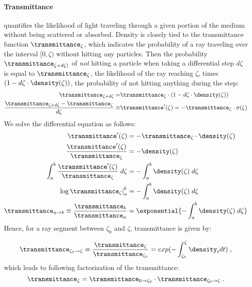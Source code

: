 \paragraph{Transmittance} 
quantifies the likelihood of light traveling through a given portion of the medium without being scattered or absorbed. Density is closely tied to the transmittance function $\transmittance_{\zeta}$, which indicates the probability of a ray traveling over the interval $[0, \zeta)$ without hitting any particles. Then the probability $\transmittance_{\zeta {+} d\zeta)}$ of \emph{not} hitting a particle when taking a differential step $d\zeta$ is equal to $\transmittance_{\zeta}$, the likelihood of the ray reaching $\zeta$, times $(1 - d\zeta \cdot \density(\zeta))$, the probability of not hitting anything during the step:
% 
\begin{align}
\transmittance_{\zeta+d\zeta} =& \transmittance_{\zeta} \cdot (1 - d\zeta \cdot \density(\zeta))
\\
\frac{\transmittance_{\zeta+d\zeta} - \transmittance_{\zeta}}{d\zeta} \equiv& \transmittance'(\zeta) = -\transmittance_{\zeta} \cdot \sigma(\zeta) 
\label{eq:derivative}
\end{align}
% 
We solve the differential equation as follows:
%
\begin{align}
\transmittance'(\zeta) &= -\transmittance_{\zeta} \cdot \density(\zeta) \\
\frac{\transmittance'(\zeta)}{\transmittance_{\zeta}} &= -\density(\zeta) \\
\int_a^b \frac{\transmittance'(\zeta)}{\transmittance_{\zeta}} \; d\zeta &= -\int_a^b \density(\zeta) \; d\zeta \\
\left. \log \transmittance_{\zeta} \right|_a^b &= -\int_a^b \density(\zeta) \; d\zeta \\
\transmittance_{a \rightarrow b} \equiv \frac{\transmittance_{b}}{\transmittance_{a}} &= \exponential{-\int_a^b \density(\zeta) \; d\zeta}   
\end{align}
% 
Hence, for a ray segment between $\zeta_0$ and $\zeta$, transmittance is given by:

\begin{equation}
\transmittance_{\zeta_0 \rightarrow \zeta} \equiv \frac{\transmittance_{\zeta}}{\transmittance_{\zeta_0}} = exp({-\int_{\zeta_0}^\zeta \density_t dt})\;,
\label{eq:trans_ab}
\end{equation}
which leads to following factorization of the transmittance:
\begin{equation}
\transmittance_{\zeta} = \transmittance_{0 \rightarrow \zeta_0} \cdot \transmittance_{\zeta_0 \rightarrow \zeta}\;.
\label{eq:factor}
\end{equation}


